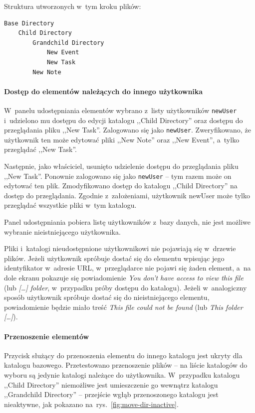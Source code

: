 \documentclass[a4paper,twoside,12pt]{book}
\newcommand{\obcy}[1]{\emph{#1}}
\newcommand{\english}[1]{{\selectlanguage{british}\obcy{#1}}}
\begin{document}
Struktura utworzonych w~tym kroku plików:
\begin{verbatim}
Base Directory
	Child Directory
		Grandchild Directory
			New Event
			New Task
		New Note
\end{verbatim}

\paragraph{Dostęp do elementów należących do innego użytkownika}
W~panelu udostępniania elementów wybrano z~listy użytkowników \texttt{newUser} i~udzielono mu dostępu do edycji katalogu ,,Child Directory'' oraz dostępu do przeglądania pliku ,,New Task''. Zalogowano się jako \texttt{newUser}. Zweryfikowano, że użytkownik ten może edytować pliki ,,New Note'' oraz ,,New Event'', a~tylko przeglądać ,,New Task''.

Następnie, jako właściciel, usunięto udzielenie dostępu do przeglądania pliku ,,New Task''. Ponownie zalogowano się jako \texttt{newUser} -- tym razem może on edytować ten plik. Zmodyfikowano dostęp do katalogu ,,Child Directory'' na dostęp do przeglądania. Zgodnie z~założeniami, użytkownik newUser może tylko przeglądać wszystkie pliki w~tym katalogu.

Panel udostępniania pobiera listę użytkowników z~bazy danych, nie jest możliwe wybranie nieistniejącego użytkownika. 

Pliki i~katalogi nieudostępnione użytkownikowi nie pojawiają się w~drzewie plików. Jeżeli użytkownik spróbuje dostać się do elementu wpisując jego identyfikator w~adresie URL, w~przeglądarce nie pojawi się żaden element, a~na dole ekranu pokazuje się powiadomienie \english{You don't have access to view this file} (lub \english{[\ldots] folder}, w~przypadku próby dostępu do katalogu). Jeżeli w~analogiczny sposób użytkownik spróbuje dostać się do nieistniejącego elementu, powiadomienie będzie miało treść \english{This file could not be found} (lub \english{This folder [\ldots]}).

\paragraph{Przenoszenie elementów}
Przycisk służący do przenoszenia elementu do innego katalogu jest ukryty dla katalogu bazowego. Przetestowano przenoszenie plików -- na liście katalogów do wyboru są jedynie katalogi należące do użytkownika. W~przypadku katalogu ,,Child Directory'' niemożliwe jest umieszczenie go wewnątrz katalogu ,,Grandchild Directory'' -- przejście wgłąb przenoszonego katalogu jest nieaktywne, jak pokazano na~rys.~\ref{fig:move-dir-inactive}.
\end{document}
